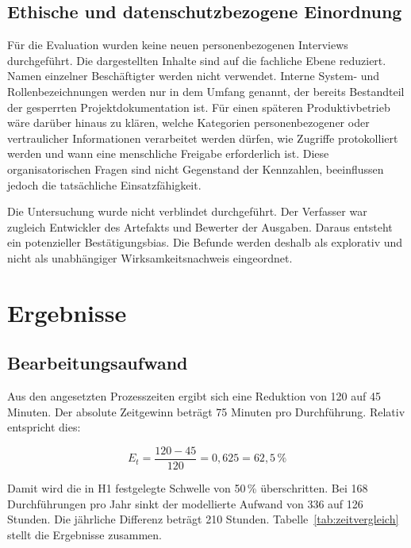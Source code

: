 \documentclass[
  10pt,
  ngerman,
  a4paper,
  toc=graduated,
  numbers=noenddot,
  headings=standardclasses,
  nonumberlist
]{scrartcl}
\newcommand{\pct}[1]{#1\,\%}
\begin{document}
\subsection{Ethische und datenschutzbezogene Einordnung}

Für die Evaluation wurden keine neuen personenbezogenen Interviews durchgeführt. Die dargestellten Inhalte sind auf die fachliche Ebene reduziert. Namen einzelner Beschäftigter werden nicht verwendet. Interne System- und Rollenbezeichnungen werden nur in dem Umfang genannt, der bereits Bestandteil der gesperrten Projektdokumentation ist. Für einen späteren Produktivbetrieb wäre darüber hinaus zu klären, welche Kategorien personenbezogener oder vertraulicher Informationen verarbeitet werden dürfen, wie Zugriffe protokolliert werden und wann eine menschliche Freigabe erforderlich ist. Diese organisatorischen Fragen sind nicht Gegenstand der Kennzahlen, beeinflussen jedoch die tatsächliche Einsatzfähigkeit.

Die Untersuchung wurde nicht verblindet durchgeführt. Der Verfasser war zugleich Entwickler des Artefakts und Bewerter der Ausgaben. Daraus entsteht ein potenzieller Bestätigungsbias. Die Befunde werden deshalb als explorativ und nicht als unabhängiger Wirksamkeitsnachweis eingeordnet.

\section{Ergebnisse}

\subsection{Bearbeitungsaufwand}

Aus den angesetzten Prozesszeiten ergibt sich eine Reduktion von 120 auf 45 Minuten. Der absolute Zeitgewinn beträgt 75 Minuten pro Durchführung. Relativ entspricht dies:

\begin{equation}
E_t = \frac{120-45}{120} = 0{,}625 = \pct{62{,}5}
\end{equation}

Damit wird die in H1 festgelegte Schwelle von \pct{50} überschritten. Bei 168 Durchführungen pro Jahr sinkt der modellierte Aufwand von 336 auf 126 Stunden. Die jährliche Differenz beträgt 210 Stunden. Tabelle~\ref{tab:zeitvergleich} stellt die Ergebnisse zusammen.
\end{document}
